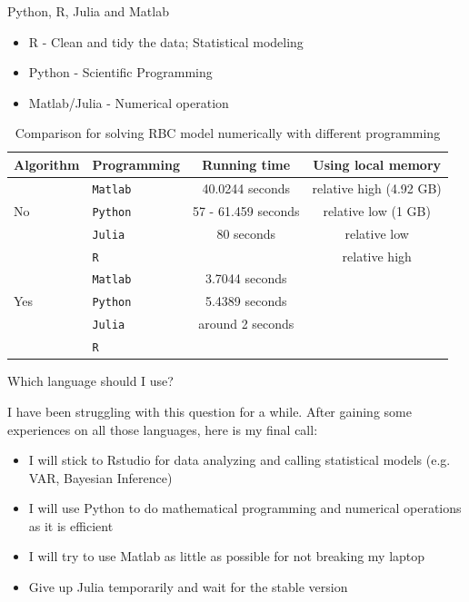 \documentclass[handout]{beamer} %
\begin{document}
\begin{frame}{Python, R, Julia and Matlab}
	\begin{itemize}
		\item R - Clean and tidy the data; Statistical modeling
		\item Python - Scientific Programming 
		\item Matlab/Julia - Numerical operation
	\end{itemize}
\begin{table}
	\centering
	\begin{tabular}{llcc}
	\toprule 
	Algorithm	& Programming & Running time & Using local memory \\
	\hline 
		&\texttt{Matlab} & 40.0244 seconds & relative high (4.92 GB)\\
		No &\texttt{Python} & 57 - 61.459 seconds & relative low (1 GB)\\
		&\texttt{Julia} & 80 seconds & relative low \\
		& \texttt{R} & & relative high\\
		\hline 
		& \texttt{Matlab} & 3.7044 seconds & \\
	Yes & \texttt{Python} & 5.4389 seconds & \\
	    & \texttt{Julia} & around 2 seconds & \\
	    & \texttt{R} & \\
	    \hline 
	    \hline 
	\end{tabular}
	\caption{Comparison for solving RBC model numerically with different programming}
\end{table}
\end{frame}

\begin{frame}{Which language should I use?}

	I have been struggling with this question for a while. After gaining some experiences on all those languages, here is my final call:
	\begin{itemize}
	\setlength\itemsep{1em}
		\item I will stick to Rstudio for data analyzing and calling statistical models (e.g. VAR, Bayesian Inference) 
		\item I will use Python to do mathematical programming and numerical operations as it is efficient
		\item I will try to use Matlab as little as possible for not breaking my laptop 
		\item Give up Julia temporarily and wait for the stable version
	\end{itemize}
\end{frame}
\end{document}
